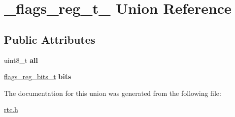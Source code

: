 \hypertarget{union__flags__reg__t__}{}\section{\+\_\+flags\+\_\+reg\+\_\+t\+\_\+ Union Reference}
\label{union__flags__reg__t__}
\subsection*{Public Attributes}
\begin{DoxyCompactItemize}
\item 
\mbox{\label{union__flags__reg__t___afa80ad65de6dce8348e543c69ec63be8}} 
uint8\+\_\+t {\bfseries all}
\item 
\mbox{\label{union__flags__reg__t___aa2b5432479569774fb94a84e929aa20f}} 
\hyperlink{struct__flags__reg__bits__t__}{flags\+\_\+reg\+\_\+bits\+\_\+t} {\bfseries bits}
\end{DoxyCompactItemize}


The documentation for this union was generated from the following file\+:\begin{DoxyCompactItemize}
\item 
\hyperlink{rtc_8h}{rtc.\+h}\end{DoxyCompactItemize}
